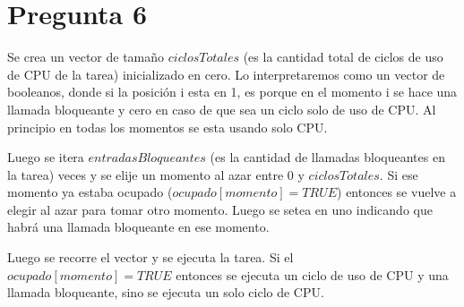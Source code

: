 \section{Pregunta 6}




Se crea un vector de tamaño $ciclosTotales$ (es la cantidad total de ciclos de uso de CPU de la tarea) inicializado en cero. Lo interpretaremos como un vector de booleanos, donde si la posición i esta en 1, es porque en el momento i se hace una llamada bloqueante y cero en caso de que sea un ciclo solo de uso de CPU. Al principio en todas los momentos se esta usando solo CPU.

Luego se itera $entradasBloqueantes$ (es la cantidad de llamadas bloqueantes en la tarea) veces y se elije un momento al azar entre 0 y $ciclosTotales$. Si ese momento ya estaba ocupado ($ocupado[momento] = TRUE$) entonces se vuelve a elegir al azar para tomar otro momento. Luego se setea en uno indicando que habrá una llamada bloqueante en ese momento.

Luego se recorre el vector y se ejecuta la tarea. Si el $ocupado[momento] = TRUE$ entonces se ejecuta un ciclo de uso de CPU y una llamada bloqueante, sino se ejecuta un solo ciclo de CPU.